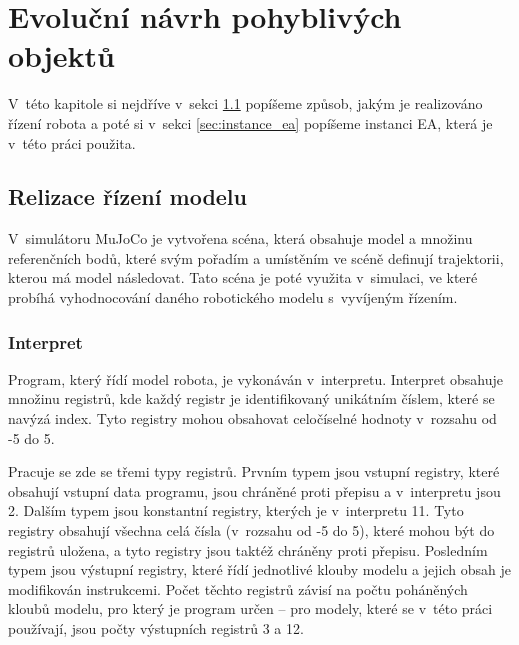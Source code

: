 
\chapter{Evoluční návrh pohyblivých objektů}
\label{chap:evolucni_navrh_pohyblivych_objektu}
V~této kapitole si nejdříve v~sekci \ref{sec:realizace_rizeni_modelu} popíšeme způsob, jakým je realizováno řízení robota a poté si v~sekci \ref{sec:instance_ea} popíšeme instanci EA, která je v~této práci použita.


\section{Relizace řízení modelu}
\label{sec:realizace_rizeni_modelu}

V~simulátoru MuJoCo je vytvořena scéna, která obsahuje model a množinu referenčních bodů, které svým pořadím a umístěním ve scéně definují trajektorii, kterou má model následovat.
Tato scéna je poté využita v~simulaci, ve které probíhá vyhodnocování daného robotického modelu s~vyvíjeným řízením.

\subsection{Interpret}

Program, který řídí model robota, je vykonáván v~interpretu.
Interpret obsahuje množinu registrů, kde každý registr je identifikovaný unikátním číslem, které se navýzá index.
Tyto registry mohou obsahovat celočíselné hodnoty v~rozsahu od -5 do 5.

Pracuje se zde se třemi typy registrů.
Prvním typem jsou vstupní registry, které obsahují vstupní data programu, jsou chráněné proti přepisu a v~interpretu jsou 2.
Dalším typem jsou konstantní registry, kterých je v~interpretu 11.
Tyto registry obsahují všechna celá čísla (v~rozsahu od -5 do 5), které mohou být do registrů uložena, a tyto registry jsou taktéž chráněny proti přepisu.
Posledním typem jsou výstupní registry, které řídí jednotlivé klouby modelu a jejich obsah je modifikován instrukcemi.
Počet těchto registrů závisí na počtu poháněných kloubů modelu, pro který je program určen -- pro modely, které se v~této práci používají, jsou počty výstupních registrů 3 a 12.


